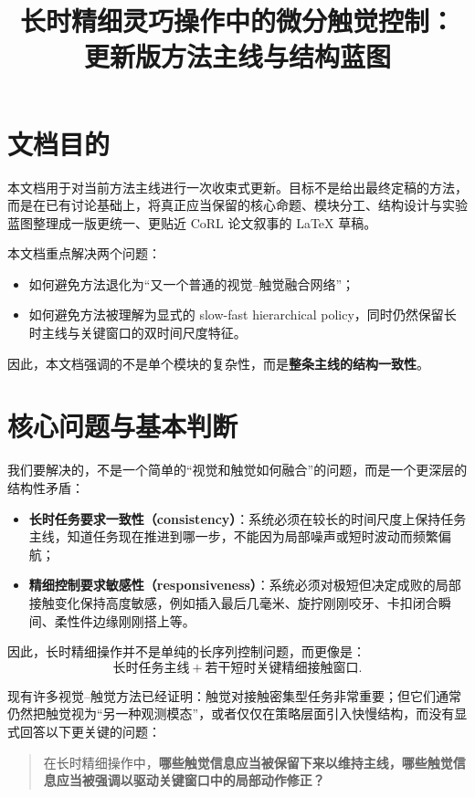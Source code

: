 \documentclass[11pt]{article}
\title{长时精细灵巧操作中的微分触觉控制：\\
更新版方法主线与结构蓝图}
\author{}
\date{}
\begin{document}
\maketitle

\section{文档目的}

本文档用于对当前方法主线进行一次收束式更新。目标不是给出最终定稿的方法，而是在已有讨论基础上，将真正应当保留的核心命题、模块分工、结构设计与实验蓝图整理成一版更统一、更贴近 CoRL 论文叙事的 \LaTeX{} 草稿。

本文档重点解决两个问题：
\begin{itemize}[leftmargin=2em]
    \item 如何避免方法退化为“又一个普通的视觉--触觉融合网络”；
    \item 如何避免方法被理解为显式的 slow-fast hierarchical policy，同时仍然保留长时主线与关键窗口的双时间尺度特征。
\end{itemize}

因此，本文档强调的不是单个模块的复杂性，而是\textbf{整条主线的结构一致性}。

\section{核心问题与基本判断}

我们要解决的，不是一个简单的“视觉和触觉如何融合”的问题，而是一个更深层的结构性矛盾：

\begin{itemize}[leftmargin=2em]
    \item \textbf{长时任务要求一致性（consistency）}：系统必须在较长的时间尺度上保持任务主线，知道任务现在推进到哪一步，不能因为局部噪声或短时波动而频繁偏航；
    \item \textbf{精细控制要求敏感性（responsiveness）}：系统必须对极短但决定成败的局部接触变化保持高度敏感，例如插入最后几毫米、旋拧刚刚咬牙、卡扣闭合瞬间、柔性件边缘刚刚搭上等。
\end{itemize}

因此，长时精细操作并不是单纯的长序列控制问题，而更像是：
\[
\text{长时任务主线} + \text{若干短时关键精细接触窗口}.
\]

现有许多视觉--触觉方法已经证明：触觉对接触密集型任务非常重要；但它们通常仍然把触觉视为“另一种观测模态”，或者仅仅在策略层面引入快慢结构，而没有显式回答以下更关键的问题：

\begin{quote}
在长时精细操作中，\textbf{哪些触觉信息应当被保留下来以维持主线，哪些触觉信息应当被强调以驱动关键窗口中的局部动作修正？}
\end{quote}
\end{document}

